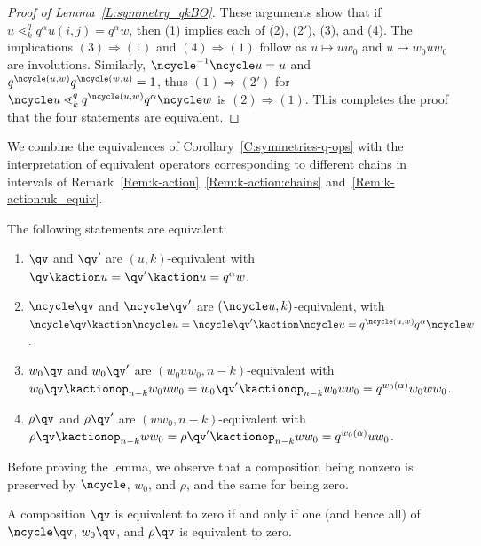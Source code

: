 \begin{proof}[Proof of Lemma~\ref{L:symmetry_qkBO}]
 These arguments show that if $u\lessdot^q_k q^\alpha u(i,j)=q^\alpha w$, then (1) implies each of (2), (2$'$), (3), and (4).
 The implications  $(3)\Rightarrow(1)$ and $(4)\Rightarrow(1)$ follow as $u\mapsto u w_0$ and  $u\mapsto w_0 u w_0$ are involutions.
 Similarly, $\ncycle^{-1}\ncycle u=u$ and $q^{\ncycle(u,w)}q^{\ncycle(w,u)}=1$, thus $(1)\Rightarrow(2')$
 for $\ncycle u \lessdot^q_k q^{\ncycle(u,w)} q^\alpha\ncycle w$ is $(2)\Rightarrow(1)$.
 This completes the proof that the four statements are equivalent.
\end{proof}

We combine the equivalences of Corollary~\ref{C:symmetries-q-ops} with the interpretation of equivalent operators
corresponding to different chains in intervals of Remark~\ref{Rem:k-action}~\ref{Rem:k-action:chains}
and~\ref{Rem:k-action:uk_equiv}.

\begin{lemma}    \label{lemma:actions}
    The following statements are equivalent:
    \begin{enumerate}[label=(\alph*)]
      
    \item \label{l:actions:a}
      $\qv$ and $\qv'$ are $(u,k)$-equivalent with $\qv \kaction u = \qv' \kaction u = q^\alpha w$.
      
    \item \label{l:actions:b}
      $\ncycle \qv$ and $\ncycle \qv'$ are $(\ncycle u, k)$-equivalent, with
                     $\ncycle\qv\kaction \ncycle u=\ncycle\qv'\kaction \ncycle u = q^{\ncycle(u,w)} q^\alpha \ncycle w$.
    \item \label{l:actions:c}
      $w_0 \qv$ and $w_0\qv'$ are $(w_0uw_0, n{-}k)$-equivalent with
                     $w_0\qv\kactionop_{n-k} w_0uw_0=w_0\qv'\kactionop_{n-k} w_0 uw_0 = q^{w_0(\alpha)} w_0 w w_0$.
    \item \label{l:actions:d}
      $\rho \qv$ and $\rho \qv'$ are $(ww_0, n{-}k)$-equivalent with
                     $\rho\qv\kactionop_{n-k} w w_0=\rho\qv'\kactionop_{n-k} ww_0 = q^{w_0(\alpha)} u w_0$.
    \end{enumerate}
\end{lemma}

Before proving the lemma, we observe
that a composition being nonzero is preserved by $\ncycle$, $w_0$, and $\rho$, and the same for being zero.

\begin{corollary}\label{C:symmetries_bzero}
  A composition $\qv$ is equivalent to zero if and only if one (and hence all) of $\ncycle\qv$, $w_0\qv$, and $\rho\qv$ is equivalent to
  zero. 
\end{corollary}

